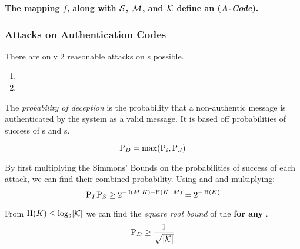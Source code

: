 \begin{large}
  \textbf{The mapping $f$, along with $\operatorname{\mathcal{S}}$, $\operatorname{\mathcal{M}}$, and $\operatorname{\mathcal{K}}$ define an  (\emph{A-Code}).}
\end{large}

\subsubsection{Attacks on Authentication Codes}\label{subsubsec:Attacks_Authentication_Codes}
There are only 2 reasonable attacks on s possible.
\begin{enumerate}[noitemsep]
\item {}
\item {}
\end{enumerate}

\begin{definition}\label{def:Probability_of_Deception}
  The \emph{probability of deception} is the probability that a non-authentic message is authenticated by the  system as a valid message.
  It is based off probabilities of success of s and s.
  
  \begin{equation}\label{eq:Probability_of_Deception}
    \operatorname{\operatorname{P}}_{D} = \max(\operatorname{\operatorname{P}}_{i}, \operatorname{\operatorname{P}}_{S})
  \end{equation}
\end{definition}

\begin{theorem}\label{thm:Prob_Deception_Square_Root_Bound}
  By first multiplying the Simmons' Bounds on the probabilities of success of each attack, we can find their combined probability.
  Using  and  and multiplying:
  \begin{equation*}
    \operatorname{\operatorname{P}}_{I}\operatorname{\operatorname{P}}_{S} \geq 2^{-\operatorname{\operatorname{I}}(M; K) - \operatorname{\operatorname{H}}(K \operatorname{\vert} M)} = 2^{-\operatorname{\operatorname{H}}(K)}
  \end{equation*}

  From $\operatorname{\operatorname{H}}(K) \leq \log_{2} \lvert \operatorname{\mathcal{K}} \rvert$ we can find the \emph{square root bound} of the  \textbf{for any }.
  \begin{equation}\label{eq:Prob_Deception_Square_Root_Bound}
    \operatorname{\operatorname{P}}_{D} \geq \frac{1}{\sqrt{\lvert \operatorname{\mathcal{K}} \rvert}}
  \end{equation}
\end{theorem}

